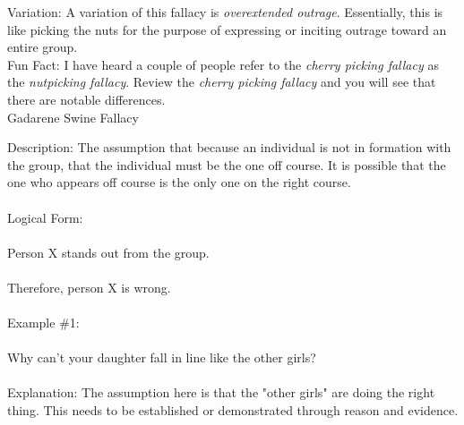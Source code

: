 \documentclass[a4paper,12pt,single,pdftex]{scrartcl}
\begin{document}
    
      Variation: A variation of this fallacy is {\it overextended outrage}. Essentially, this is like picking the nuts for the purpose of expressing or inciting outrage toward an entire group.
    \\

    
      Fun Fact: I have heard a couple of people refer to the {\em cherry picking fallacy} as the {\em nutpicking fallacy}. Review the {\em cherry picking fallacy} and you will see that there are notable differences.
    \\

  

Gadarene Swine Fallacy
    
      Description: The assumption that because an individual is not in formation with the group, that the individual must be the one off course. It is possible that the one who appears off course is the only one on the right course.
    \\

    
      
    \\

    
      Logical Form:
    \\

    
      
    \\

    
      Person X stands out from the group.
    \\

    
      
    \\

    
      Therefore, person X is wrong.
    \\

    
      
    \\

    
      Example \#1:
    \\

    
      
    \\

    
      Why can't your daughter fall in line like the other girls?
    \\

    
      
    \\

    
      Explanation: The assumption here is that the "other girls" are doing the right thing. This needs to be established or demonstrated through reason and evidence.
    \\
\end{document}
